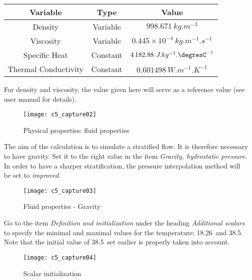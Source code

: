 \begin{center}
\begin{tabular}{c|c|c}
Variable & Type & Value \\
\hline
Density & Variable & $998.671\ kg.m^{-3} $ \\
\hline
Viscosity & Variable & $0.445\times 10^{-4}\ kg.m^{-1}.s^{-1} $ \\
\hline
Specific Heat & Constant & $4\,182.88\ J.kg^{-1}.\mbox{\degresC}^{-1} $ \\
\hline
Thermal Conductivity & Constant & $0.601498\ W.m^{-1}.K^{-1}$
\end{tabular}
\end{center}

For density and viscosity, the value given here will serve as a reference
value (see user manual for details).

\begin{figure}[h!]
\begin{center}
\texttt{[image: c5\_capture02]}
\caption{Physical properties: fluid properties}
\label{fig2_e5}
\end{center}
\end{figure}


\newpage
The aim of the calculation is to simulate a stratified flow. It is therefore
necessary to have gravity. Set it to the right value in the item
{\itshape Gravity, hydrostatic pressure}.  In order to have a sharper
stratification, the pressure interpolation method will be set to
{\itshape improved}.

\begin{figure}[h!]
\begin{center}
\texttt{[image: c5\_capture03]}
\caption{Fluid properties - Gravity}
\label{fig3_e5}
\end{center}
\end{figure}


\newpage

Go to the item {\itshape Definition and initialization} under the heading
{\itshape Additional scalars} to specify the minimal and maximal values for the
temperature: 18.26\degresC\ and 38.5\degresC. Note that the initial value of
38.5\degresC\ set earlier is properly taken into account.

\begin{figure}[h!]
\begin{center}
\texttt{[image: c5\_capture04]}
\caption{Scalar initialization}
\label{fig4_e5}
\end{center}
\end{figure}


